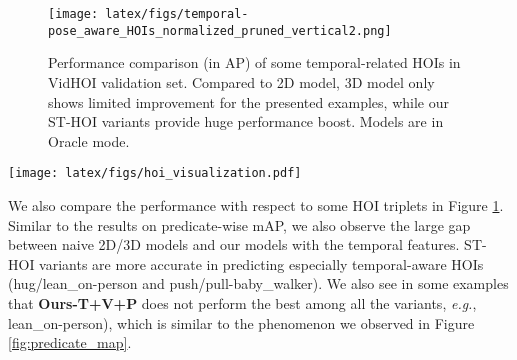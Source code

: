 \documentclass[sigconf]{acmart}
\begin{document}
\begin{figure}[t!]
\centering
\texttt{[image: latex/figs/temporal-pose\_aware\_HOIs\_normalized\_pruned\_vertical2.png]}
\vspace{-1.3em}
\caption{
Performance comparison (in AP) of some temporal-related HOIs in VidHOI validation set.
Compared to 2D model, 3D model only shows limited improvement for the presented examples, while our ST-HOI variants provide huge performance boost.
Models are in {\selectfont Oracle} mode.
}
\vspace{-1.5em}
\label{fig:hoi_examples}
\end{figure}

\begin{figure*}[t!]
\centering
\texttt{[image: latex/figs/hoi\_visualization.pdf]}
\vspace{-1.3em}
\caption{Examples of video HOIs predicted by the 2D model \cite{wan2019pose} and our ST-HOI, both in {\selectfont Oracle} mode.
Each consists of five consecutive keyframes sampled in 1 Hz, where an entry in tables denotes whether a predicate between the subject (human; a green box) and the object (also human in both cases; a red box) is detected correctly (True Positive) or not (False Positive or False Negative).
Compared to the 2D baseline, our model predicts more accurate temporal HOIs (\emph{e.g.}, {\selectfont hold\_hand\_of} in  and  of the upper example and {\selectfont lift} in  of the lower example).
ST-HOI also produces less false positives in both examples.
}
\vspace{-1em}
\label{fig:hoi_visualization}
\end{figure*}

We also compare the performance with respect to some HOI triplets in Figure \ref{fig:hoi_examples}.
Similar to the results on predicate-wise mAP, we also observe the large gap between naive 2D/3D models and our models with the temporal features. 
ST-HOI variants are more accurate in predicting especially temporal-aware HOIs ({\selectfont hug/lean\_on-person} and {\selectfont push/pull-baby\_walker}).
We also see in some examples that \textbf{Ours-T+V+P} does not perform the best among all the variants, \emph{e.g.}, {\selectfont lean\_on-person}), which is similar to the phenomenon we observed in Figure \ref{fig:predicate_map}.
\end{document}
